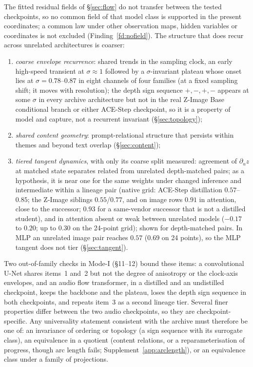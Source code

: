 \documentclass[11pt]{article}
\theoremstyle{definition}
\begin{document}
The fitted residual fields of \S\ref{sec:flow} do not transfer between the tested checkpoints, so no common field of that model class is supported in the present coordinates; a common law under other observation maps, hidden variables or coordinates is not excluded (Finding~\ref{fd:nofield}). The structure that does recur across unrelated architectures is coarser:
\begin{enumerate}
 \item \emph{coarse envelope recurrence}: shared trends in the sampling clock, an early high-speed transient at $\sigma\approx1$ followed by a $\sigma$-invariant plateau whose onset lies at $\sigma=0.78$--$0.87$ in eight channels of four families (at a fixed sampling shift; it moves with resolution); the depth sign sequence $+,-,+,-$ appears at some $\sigma$ in every archive architecture but not in the real Z-Image Base conditional branch or either ACE-Step checkpoint, so it is a property of model and capture, not a recurrent invariant (\S\ref{sec:topology});
 \item \emph{shared content geometry}: prompt-relational structure that persists within themes and beyond text overlap (\S\ref{sec:content});
 \item \emph{tiered tangent dynamics}, with only its coarse split measured: agreement of $\partial_uz$ at matched state separates related from unrelated depth-matched pairs; as a hypothesis, it is near one for the same weights under changed inference and intermediate within a lineage pair (native grid: ACE-Step distillation $0.57$--$0.85$; the Z-Image siblings $0.55$/$0.77$, and on image rows $0.91$ in attention, close to the successor; $0.93$ for a same-vendor successor that is not a distilled student), and in attention absent or weak between unrelated models ($-0.17$ to $0.20$; up to $0.30$ on the 24-point grid); shown for depth-matched pairs. In MLP an unrelated image pair reaches $0.57$ ($0.69$ on 24 points), so the MLP tangent does not tier (\S\ref{sec:tangent}).
\end{enumerate}
Two out-of-family checks in Mode-I (\S11--12) bound these items: a convolutional U-Net shares items~1 and~2 but not the degree of anisotropy or the clock-axis envelopes, and an audio flow transformer, in a distilled and an undistilled checkpoint, keeps the backbone and the plateau, loses the depth sign sequence in both checkpoints, and repeats item~3 as a second lineage tier. Several finer properties differ between the two audio checkpoints, so they are checkpoint-specific. Any universality statement consistent with the archive must therefore be one of: an invariance of ordering or topology (a sign sequence with its surrogate class), an equivalence in a quotient (content relations, or a reparameterisation of progress, though arc length fails; Supplement~\ref{app:arclength}), or an equivalence class under a family of projections.
\end{document}
